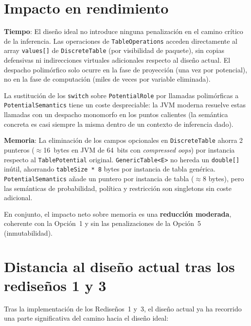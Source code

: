 \documentclass[11pt,a4paper]{article}
\newcommand{\code}[1]{\texttt{#1}}
\newcommand{\good}[1]{\textcolor{codegreen}{\textbf{#1}}}
\begin{document}
\section{Impacto en rendimiento}
\label{sec:ideal-rendimiento}

\textbf{Tiempo}: El diseño ideal no introduce ninguna penalización en el
camino crítico de la inferencia.  Las operaciones de \code{TableOperations}
acceden directamente al array \code{values[]} de \code{DiscreteTable} (por
visibilidad de paquete), sin copias defensivas ni indirecciones virtuales
adicionales respecto al diseño actual.  El despacho polimórfico solo ocurre
en la fase de proyección (una vez por potencial), no en la fase de computación
(miles de veces por variable eliminada).

La sustitución de los \code{switch} sobre \code{PotentialRole} por llamadas
polimórficas a \code{PotentialSemantics} tiene un coste despreciable: la JVM
moderna resuelve estas llamadas con un despacho monomorfo en los puntos
calientes (la semántica concreta es casi siempre la misma dentro de un
contexto de inferencia dado).

\textbf{Memoria}: La eliminación de los campos opcionales en
\code{DiscreteTable} ahorra 2 punteros ($\approx$16~bytes en JVM de 64~bits
con \emph{compressed oops}) por instancia respecto al \code{TablePotential}
original.  \code{GenericTable<E>} no hereda un \code{double[]} inútil,
ahorrando \code{tableSize * 8} bytes por instancia de tabla genérica.
\code{PotentialSemantics} añade un puntero por instancia de tabla ($\approx$8
bytes), pero las semánticas de probabilidad, política y restricción son
singletons sin coste adicional.

En conjunto, el impacto neto sobre memoria es una \good{reducción moderada},
coherente con la Opción~1 y sin las penalizaciones de la Opción~5
(inmutabilidad).

\section{Distancia al diseño actual tras los rediseños 1 y 3}
\label{sec:ideal-distancia}

Tras la implementación de los Rediseños~1 y~3, el diseño actual ya ha
recorrido una parte significativa del camino hacia el diseño ideal:
\end{document}
